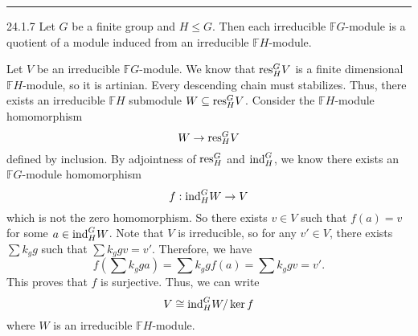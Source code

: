\documentclass[a4paper, 12pt]{article}
\begin{document}
\noindent\rule{7in}{2.8pt}
\begin{problem}{24.1.7}
Let \(G\) be a finite group and \(H\leq G\). Then each irreducible \(\mathbb{F}G\)-module is a quotient of a module induced from an irreducible \(\mathbb{F}H\)-module. 
\end{problem}
\begin{solution}
Let \(V\) be an irreducible \(\mathbb{F}G\)-module. We know that \(\text{res}^G_HV\) is a finite dimensional \(\mathbb{F}H\)-module, so it is artinian. Every descending chain must stabilizes. Thus, there exists an irreducible \(\mathbb{F}H\) submodule \(W\subseteq \text{res}^G_HV\). Consider the \(\mathbb{F}H\)-module homomorphism 
\[W\rightarrow \text{res}^G_HV\]
defined by inclusion. By adjointness of \(\text{res}^G_H\) and \(\text{ind}^G_H\), we know there exists an \(\mathbb{F}G\)-module homomorphism 
\[f:\text{ind}^G_HW\rightarrow V\]
which is not the zero homomorphism. So there exists \(v\in V\) such that \(f(a)=v\) for some \(a\in \text{ind}^G_HW\). Note that \(V\) is irreducible, so for any \(v'\in V\), there exists \(\sum k_g g\) such that \(\sum k_g gv=v'\). Therefore, we have 
\[f(\sum k_g ga)=\sum k_g gf(a)=\sum k_g gv=v'.\]
This proves that \(f\) is surjective. Thus, we can write 
\[V\cong \text{ind}^G_HW/\ker f\]
where \(W\) is an irreducible \(\mathbb{F}H\)-module.
\end{solution}
\end{document}
